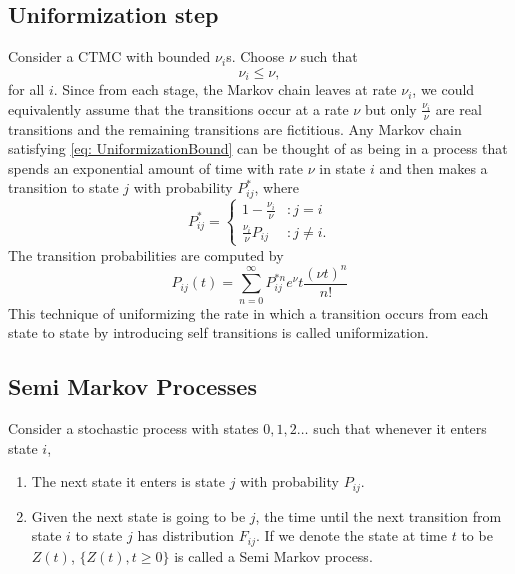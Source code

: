 \documentclass[a4paper,10pt,english]{article}
\begin{document}
\subsection{Uniformization step}
Consider a CTMC with bounded $\nu_i$s. Choose $\nu$ such that 
\begin{equation}
\label{eq: UniformizationBound}
\nu_i \leq \nu,
\end{equation}
for all $i$. Since from each stage, the Markov chain leaves at rate $\nu_i$, we could equivalently assume that the transitions occur at a rate $\nu$ but only $\frac{\nu_i}{\nu}$ are real transitions and the remaining transitions are fictitious. Any Markov chain satisfying \eqref{eq: UniformizationBound} can be thought of as being in a process that spends an exponential amount of time with rate $\nu$ in state $i$ and then makes a transition to state $j$ with probability $P_{ij}^*$, where
\begin{equation}
P_{ij}^* = \left\{
     \begin{array}{lr}
       1-\frac{\nu_i}{\nu} & : j =i\\
       \frac{\nu_i}{\nu}P_{ij} & : j \neq i.
     \end{array}
   \right.
\end{equation}   
The transition probabilities are computed by 
\begin{equation*}
P_{ij}(t)=\sum_{n=0}^{\infty}P_{ij}^{*n}e^{\nu}t \frac{{(\nu t)}^n}{n!}
\end{equation*}
This technique of uniformizing the rate in which a transition occurs from each state to state by introducing self transitions is called uniformization.





\subsection{Semi Markov Processes}
Consider a stochastic process with states $0,1,2 \hdots$ such that whenever it enters state $i$,
\begin{enumerate}
\item {The next state it enters is state $j$ with probability $P_{ij}$.}\\
\item {Given the next state is going to be $j$, the time until the next transition from state $i$ to state $j$ has distribution $F_{ij}$. If we denote the state at time $t$ to be $Z(t)$, $\{Z(t), t \geq 0\}$ is called a Semi Markov process.}
\end{enumerate}
\end{document}
